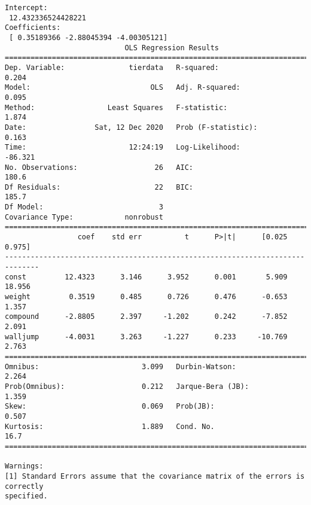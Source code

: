 \documentclass[11pt]{article}
\begin{document}
    \begin{Verbatim}[commandchars=\\\{\}]
Intercept:
 12.432336524428221
Coefficients:
 [ 0.35189366 -2.88045394 -4.00305121]
                            OLS Regression Results
==============================================================================
Dep. Variable:               tierdata   R-squared:                       0.204
Model:                            OLS   Adj. R-squared:                  0.095
Method:                 Least Squares   F-statistic:                     1.874
Date:                Sat, 12 Dec 2020   Prob (F-statistic):              0.163
Time:                        12:24:19   Log-Likelihood:                -86.321
No. Observations:                  26   AIC:                             180.6
Df Residuals:                      22   BIC:                             185.7
Df Model:                           3
Covariance Type:            nonrobust
==============================================================================
                 coef    std err          t      P>|t|      [0.025      0.975]
------------------------------------------------------------------------------
const         12.4323      3.146      3.952      0.001       5.909      18.956
weight         0.3519      0.485      0.726      0.476      -0.653       1.357
compound      -2.8805      2.397     -1.202      0.242      -7.852       2.091
walljump      -4.0031      3.263     -1.227      0.233     -10.769       2.763
==============================================================================
Omnibus:                        3.099   Durbin-Watson:                   2.264
Prob(Omnibus):                  0.212   Jarque-Bera (JB):                1.359
Skew:                           0.069   Prob(JB):                        0.507
Kurtosis:                       1.889   Cond. No.                         16.7
==============================================================================

Warnings:
[1] Standard Errors assume that the covariance matrix of the errors is correctly
specified.
    \end{Verbatim}
\end{document}
